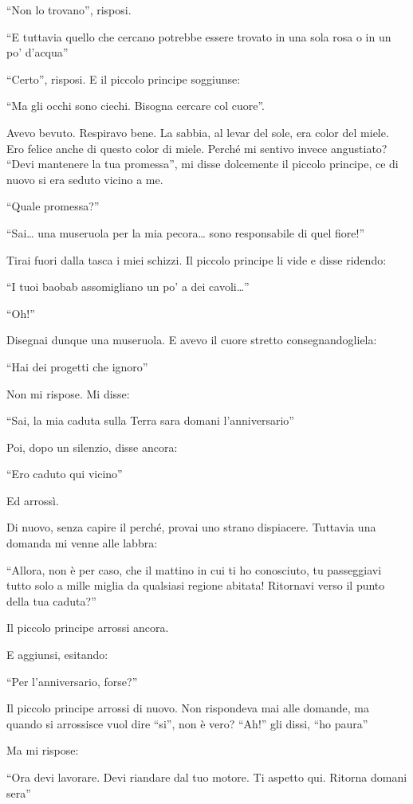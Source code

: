 \documentclass[11pt]{scrbook}
\begin{document}
``Non lo trovano'', risposi.

``E tuttavia quello che cercano potrebbe essere trovato in una sola rosa
o in un po' d'acqua''

``Certo'', risposi. E il piccolo principe soggiunse:

``Ma gli occhi sono ciechi. Bisogna cercare col cuore''.

Avevo bevuto. Respiravo bene. La sabbia, al levar del sole, era color
del miele. Ero felice anche di questo color di miele. Perché mi sentivo
invece angustiato? ``Devi mantenere la tua promessa'', mi disse
dolcemente il piccolo principe, ce di nuovo si era seduto vicino a me.

``Quale promessa?''

``Sai\ldots{} una museruola per la mia pecora\ldots{} sono responsabile
di quel fiore!''

Tirai fuori dalla tasca i miei schizzi. Il piccolo principe li vide e
disse ridendo:

``I tuoi baobab assomigliano un po' a dei cavoli\ldots{}''

``Oh!''

Disegnai dunque una museruola. E avevo il cuore stretto
consegnandogliela:

``Hai dei progetti che ignoro''

Non mi rispose. Mi disse:

``Sai, la mia caduta sulla Terra sara domani l'anniversario''

Poi, dopo un silenzio, disse ancora:

``Ero caduto qui vicino''

Ed arrossì.

Di nuovo, senza capire il perché, provai uno strano dispiacere. Tuttavia
una domanda mi venne alle labbra:

``Allora, non è per caso, che il mattino in cui ti ho conosciuto, tu
passeggiavi tutto solo a mille miglia da qualsiasi regione abitata!
Ritornavi verso il punto della tua caduta?''

Il piccolo principe arrossi ancora.

E aggiunsi, esitando:

``Per l'anniversario, forse?''

Il piccolo principe arrossi di nuovo. Non rispondeva mai alle domande,
ma quando si arrossisce vuol dire ``si'', non è vero? ``Ah!'' gli dissi,
``ho paura''

Ma mi rispose:

``Ora devi lavorare. Devi riandare dal tuo motore. Ti aspetto qui.
Ritorna domani sera''
\end{document}
